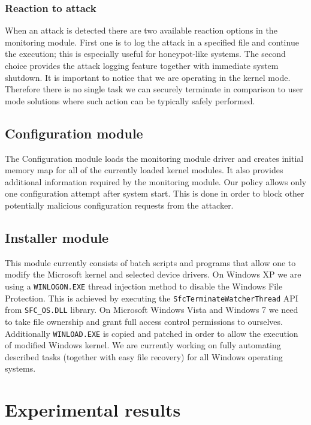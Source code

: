 \documentclass[10pt,twocolumn,a4paper]{article}
\begin{document}
\subsubsection{Reaction to attack}

When an attack is detected there are two available reaction options in the monitoring module. First one is to log the attack in a specified file and continue the execution; this is especially useful for honeypot-like systems. The second choice provides the attack logging feature together with immediate system shutdown. It is important to notice that we are operating in the kernel mode. Therefore there is no single task we can securely terminate in comparison to user mode solutions where such action can be typically safely performed.

\subsection{Configuration module}

The Configuration module loads the monitoring module driver and creates initial memory map for all of the currently loaded kernel modules. It also provides additional information required by the monitoring module. Our policy allows only one configuration attempt after system start. This is done in order to block other potentially malicious configuration requests from the attacker.

\subsection{Installer module}

This module currently consists of batch scripts and programs that allow one to modify the Microsoft kernel and selected device drivers. On Windows XP we are using a {\tt{WINLOGON.EXE}} thread injection method to disable the Windows File Protection. This is achieved by executing the  {\tt{SfcTerminateWatcherThread}} API from {\tt{SFC\_OS.DLL}} library. On Microsoft Windows Vista and Windows 7 we need to take file ownership and grant full access control permissions to ourselves. Additionally {\tt{WINLOAD.EXE}} is copied and patched in order to allow the execution of modified Windows kernel. We are currently working on fully automating described tasks (together with easy file recovery) for all Windows operating systems.

\section{Experimental results}
\end{document}
